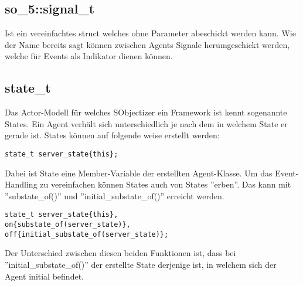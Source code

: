 \subsection{so\_5::signal\_t}
Ist ein vereinfachtes struct welches ohne Parameter abeschickt werden kann. Wie der Name bereits sagt können
zwischen Agents Signale herumgeschickt werden, welche für Events als Indikator dienen können.

\subsection{state\_t}
Das Actor-Modell für welches SObjectizer ein Framework ist kennt sogenannte States. Ein Agent verhält sich
unterschiedlich je nach dem in welchem State er gerade ist.
States können auf folgende weise erstellt werden:
\begin{verbatim}
state_t server_state{this};
\end{verbatim}
Dabei ist State eine Member-Variable der erstellten Agent-Klasse.
Um das Event-Handling zu vereinfachen können States auch von States ''erben''.
Das kann mit ''substate\_of()'' und ''initial\_substate\_of()'' erreicht werden.
\begin{verbatim}
state_t server_state{this},
on{substate_of(server_state)},
off{initial_substate_of(server_state)};
\end{verbatim}
Der Unterschied zwischen diesen beiden Funktionen ist, dass bei ''initial\_substate\_of()'' der erstellte State
derjenige ist, in welchem sich der Agent initial befindet.



